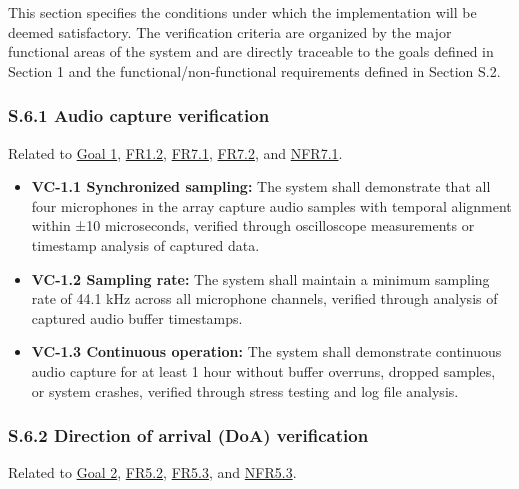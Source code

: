 \documentclass[12pt]{article}
\theoremstyle{definition}
\begin{document}
This section specifies the conditions under which the implementation will be 
deemed satisfactory. The verification criteria are organized by the major 
functional areas of the system and are directly traceable to the goals 
defined in Section 1 and the functional/non-functional requirements defined 
in Section S.2.

\subsubsection{S.6.1 Audio capture verification}

Related to \hyperref[goal:audio_capture]{Goal 1}, \hyperref[FR1_2]{FR1.2}, 
\hyperref[FR7_1]{FR7.1}, \hyperref[FR7_2]{FR7.2}, and \hyperref[NFR7_1]{NFR7.1}.

\begin{itemize}
\item \textbf{VC-1.1 Synchronized sampling:} The system shall demonstrate that 
all four microphones in the array capture audio samples with temporal alignment 
within ±10 microseconds, verified through oscilloscope measurements or 
timestamp analysis of captured data.

\item \textbf{VC-1.2 Sampling rate:} The system shall maintain a minimum 
sampling rate of 44.1 kHz across all microphone channels, verified through 
analysis of captured audio buffer timestamps.

\item \textbf{VC-1.3 Continuous operation:} The system shall demonstrate 
continuous audio capture for at least 1 hour without buffer overruns, 
dropped samples, or system crashes, verified through stress testing and 
log file analysis.
\end{itemize}

\subsubsection{S.6.2 Direction of arrival (DoA) verification}

Related to \hyperref[goal:audio_direction_analysis]{Goal 2}, \hyperref[FR5_2]{FR5.2}, 
\hyperref[FR5_3]{FR5.3}, and \hyperref[NFR5_3]{NFR5.3}.
\end{document}
